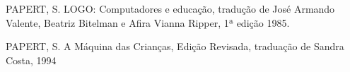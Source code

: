 \documentclass[
12pt,		%
openright,	%
twoside,  %
a4paper,			%
chapter=TITLE,		%
english,			%
french,				%
spanish,			%
brazil				%
]{USPSC-classe/USPSC}
\begin{document}
\begin{flushleft}
\begin{flushleft}
\begin{flushleft}
\begin{flushleft}
\begin{flushleft}
\begin{flushleft}
\begin{flushleft}
\begin{flushleft}
\begin{flushleft}
[PAPERT, 1980] PAPERT, S. LOGO: Computadores e educa\c{c}\~ao, tradu\c{c}\~ao de Jos\'e Armando Valente, Beatriz Bitelman e Afira Vianna Ripper, 1ª edi\c{c}\~ao 1985.
\end{flushleft}


\end{flushleft}


\end{flushleft}


\end{flushleft}


\end{flushleft}


\end{flushleft}


\end{flushleft}


\end{flushleft}


\end{flushleft}


\begin{flushleft}
\begin{flushleft}
\begin{flushleft}
\begin{flushleft}
\begin{flushleft}
\begin{flushleft}
\begin{flushleft}
\begin{flushleft}
\begin{flushleft}
[PAPERT, 1994] PAPERT, S. A M\'aquina das Crian\c{c}as, Edi\c{c}\~ao Revisada, tradua\c{c}\~ao de Sandra Costa, 1994
\end{flushleft}


\end{flushleft}


\end{flushleft}


\end{flushleft}


\end{flushleft}


\end{flushleft}


\end{flushleft}


\end{flushleft}


\end{flushleft}
\end{document}
